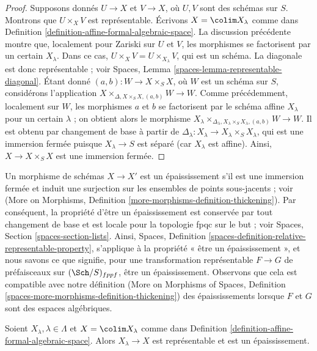 \begin{proof}
Supposons donnés $U \to X$ et $V \to X$, où $U, V$ sont des schémas sur $S$.
Montrons que $U \times_X V$ est représentable. Écrivons $X = \colim X_\lambda$
comme dans Definition \ref{definition-affine-formal-algebraic-space}.
La discussion précédente montre que, localement pour Zariski sur $U$ et $V$, les morphismes
se factorisent par un certain $X_\lambda$. Dans ce cas,
$U \times_X V = U \times_{X_\lambda} V$, qui est un schéma.
La diagonale est donc représentable ; voir
Spaces, Lemma \ref{spaces-lemma-representable-diagonal}.
Étant donné $(a, b) : W \to X \times_S X$, où $W$ est un schéma sur $S$,
considérons l'application $X \times_{\Delta, X \times_S X, (a, b)} W \to W$.
Comme précédemment, localement sur $W$, les morphismes $a$ et $b$ se factorisent par
le schéma affine $X_\lambda$ pour un certain $\lambda$ ; on obtient alors
le morphisme
$X_\lambda
\times_{\Delta_\lambda, X_\lambda \times_S X_\lambda, (a, b)} W \to W$.
Il est obtenu par changement de base à partir de
$\Delta_\lambda : X_\lambda \to X_\lambda \times_S X_\lambda$,
qui est une immersion fermée puisque $X_\lambda \to S$ est séparé
(car $X_\lambda$ est affine).
Ainsi, $X \to X \times_S X$ est une immersion fermée.
\end{proof}

\noindent
Un morphisme de schémas $X \to X'$ est un épaississement s'il est une immersion fermée
et induit une surjection sur les ensembles de points sous-jacents ; voir
(More on Morphisms, Definition
\ref{more-morphisms-definition-thickening}).
Par conséquent, la propriété d'être un épaississement est conservée par tout
changement de base et est locale pour la topologie fpqc sur le but ; voir
Spaces, Section \ref{spaces-section-lists}.
Ainsi, Spaces, Definition \ref{spaces-definition-relative-representable-property},
s'applique à la propriété « être un épaississement », et nous savons ce que signifie, pour une
transformation représentable $F \to G$ de
préfaisceaux sur $(\Sch/S)_{fppf}$, être un épaississement.
Observons que cela est compatible avec notre définition
(More on Morphisms of Spaces, Definition
\ref{spaces-more-morphisms-definition-thickening})
des épaississements lorsque $F$ et $G$ sont des espaces algébriques.

\begin{lemma}
\label{lemma-covering-by-thickenings}
Soient $X_\lambda, \lambda \in \Lambda$ et $X = \colim X_\lambda$
comme dans Definition \ref{definition-affine-formal-algebraic-space}.
Alors $X_\lambda \to X$ est représentable et est un épaississement.
\end{lemma}

